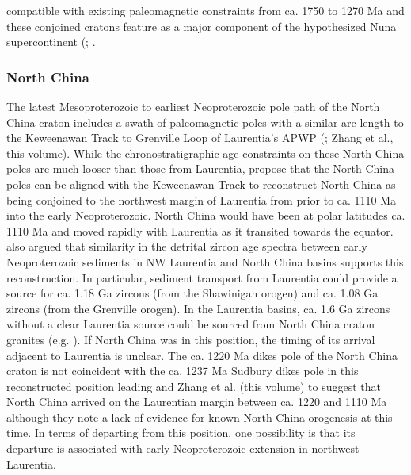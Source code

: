 \documentclass[11pt,letterpaper]{article}
\begin{document}
compatible with existing paleomagnetic constraints from ca. 1750 to 1270 Ma \cite{Evans2008a} and these conjoined cratons feature as a major component of the hypothesized Nuna supercontinent (\citealp{Evans2011a, Zhang2012a}; .


\subsubsection{North China}

The latest Mesoproterozoic to earliest Neoproterozoic pole path of the North China craton includes a swath of paleomagnetic poles with a similar arc length to the Keweenawan Track to Grenville Loop of Laurentia's APWP (\citealp{Zhao2019a}; Zhang et al., this volume). While the chronostratigraphic age constraints on these North China poles are much looser than those from Laurentia, \cite{Zhao2019a} propose that the North China poles can be aligned with the Keweenawan Track to reconstruct North China as being conjoined to the northwest margin of Laurentia from prior to ca. 1110 Ma into the early Neoproterozoic. North China would have been at polar latitudes ca. 1110 Ma and moved rapidly with Laurentia as it transited towards the equator. \cite{Zhao2019a} also argued that similarity in the detrital zircon age spectra between early Neoproterozoic sediments in NW Laurentia and North China basins supports this reconstruction. In particular, sediment transport from Laurentia could provide a source for ca. 1.18 Ga zircons (from the Shawinigan orogen) and ca. 1.08 Ga zircons (from the Grenville orogen). In the Laurentia basins, ca. 1.6 Ga zircons without a clear Laurentia source could be sourced from North China craton granites (e.g. \citealp{Wang2020a}). If North China was in this position, the timing of its arrival adjacent to Laurentia is unclear. The ca. 1220 Ma dikes pole of the North China craton is not coincident with the ca. 1237 Ma Sudbury dikes pole in this reconstructed position leading \cite{Zhao2019a} and Zhang et al. (this volume) to suggest that North China arrived on the Laurentian margin between ca. 1220 and 1110 Ma although they note a lack of evidence for known North China orogenesis at this time. In terms of departing from this position, one possibility is that its departure is associated with early Neoproterozoic extension in northwest Laurentia.

\end{document}
